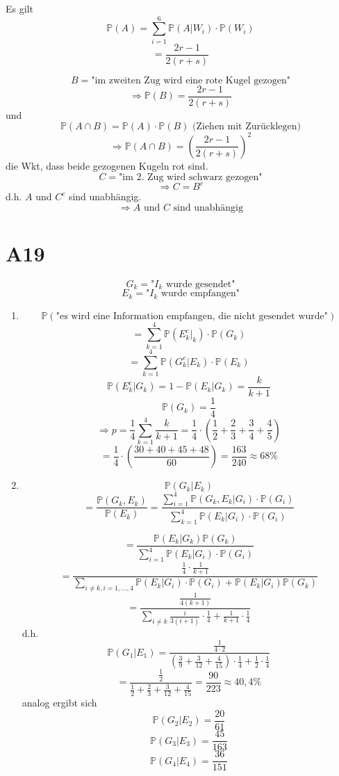 \documentclass[a4paper,11pt,notitlepage]{report}
\newcommand{\Prim}{{\ensuremath{\mathbb{P}}}}
\begin{document}
Es gilt 
$$\Prim(A) = \sum\limits_{i=1}^6{\Prim(A|W_i) \cdot \Prim(W_i)}$$
$$ = \frac{2r-1}{2(r+s)}$$

$$B = \text{"im zweiten Zug wird eine rote Kugel gezogen"}$$
$$\Rightarrow \Prim(B) = \frac{2r-1}{2(r+s)}$$
und $$\Prim(A \cap B) = \Prim(A) \cdot \Prim(B) \text{ (Ziehen mit Zurücklegen)}$$
$$\Rightarrow \Prim(A \cap B) = \left(\frac{2r-1}{2(r+s)}\right)^2$$
die Wkt, dass beide gezogenen Kugeln rot sind.
$$C = \text{"im 2. Zug wird schwarz gezogen"}$$
$$\Rightarrow C = B^c$$
d.h. $A$ und $C^c$ sind unabhängig.
$$\Rightarrow A \text{ und } C \text{ sind unabhängig}$$

\newpage

\section{A19}
$$G_k = \text{"$I_k$ wurde gesendet"}$$
$$E_k = \text{"$I_k$ wurde empfangen"}$$
\begin{enumerate}
	\item $$\Prim(\text{"es wird eine Information empfangen, die nicht gesendet wurde"})$$
	$$=\sum\limits_{k=1}^4{\Prim(E_k^c | _k) \cdot \Prim(G_k)}$$
	$$= \sum\limits_{k=1}^4{\Prim(G_k^c | E_k) \cdot \Prim(E_k)}$$
	$$\Prim(E_k^c|G_k) = 1- \Prim(E_k | G_k) = \frac{k}{k+1}$$
	$$\Prim(G_k) = \frac{1}{4}$$
	$$\Rightarrow p = \frac{1}{4} \sum\limits_{k=1}^4{\frac{k}{k+1}} = \frac{1}{4} \cdot \left (\frac{1}{2} + \frac{2}{3} + \frac{3}{4} + \frac{4}{5} \right )$$
	$$= \frac{1}{4} \cdot \left( \frac{30+40+45+48}{60} \right ) = \frac{163}{240} \approx 68 \%$$
	\item $$\Prim(G_k | E_k)$$
	$$= \frac{\Prim(G_k, E_k)}{\Prim(E_k)} = \frac{\sum\limits_{i=1}^4{\Prim(G_k, E_k | G_i) \cdot \Prim(G_i)}}{\sum\limits_{k=1}^4{\Prim(E_k | G_i) \cdot \Prim(G_i)}}$$

$$= \frac{\Prim(E_k | G_k) \Prim(G_k)}{\sum\limits_{i=1}^4{\Prim(E_k|G_i) \cdot \Prim(G_i)}}$$
$$= \frac{\frac{1}{4} \cdot \frac{1}{k+1}}{\sum\limits_{i\neq k, i = 1, \ldots, 4}{\Prim(E_k|G_i) \cdot \Prim(G_i) + \Prim(E_k | G_i) \Prim(G_k)}}$$
$$= \frac{\frac{1}{4(k+1)}}{\sum\limits_{i \neq k}{\frac{i}{3(i+1)} \cdot \frac{1}{4} + \frac{1}{k+1} \cdot \frac{1}{4}}}$$
d.h.
$$\Prim(G_1 | E_1) = \frac{\frac{1}{4 \cdot 2}}{(\frac{3}{9} + \frac{3}{12} + \frac{4}{15}) \cdot \frac{1}{4} + \frac{1}{2} \cdot \frac{1}{4}}$$
$$= \frac{\frac{1}{2}}{\frac{1}{2}+\frac{2}{3}+\frac{3}{12}+\frac{4}{15}} = \frac{90}{223} \approx 40,4 \%$$
analog ergibt sich
$$\Prim(G_2|E_2) = \frac{20}{61}$$
$$\Prim(G_3 | E_3) = \frac{45}{163}$$
$$\Prim(G_4 | E_4) = \frac{36}{151}$$
\end{enumerate}
\end{document}
